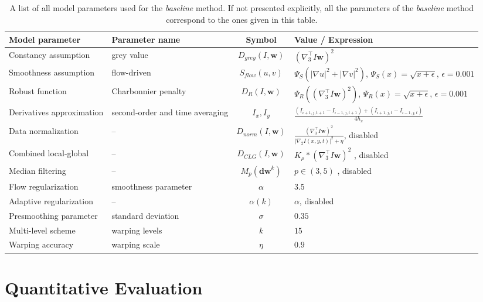 \begin{table}[ht] \footnotesize
\centering
\caption{A list of all model parameters used for the \textit{baseline} method. If not presented explicitly, all the parameters of the \textit{baseline} method  correspond to the ones given in this table.}
\begin{tabular}{lp{3cm}cp{5cm}}
\toprule
Model parameter & Parameter name & Symbol & Value / Expression   \\ 
\midrule
\midrule
Constancy assumption    & grey value & $D_{grey}(I,\textbf{w})$ & $(\nabla_{3}^{\top}I\textbf{w})^2$ \\ 
Smoothness assumption   & flow-driven & $S_{flow}(u,v)$ & $\Psi_{S}(|\nabla u|^2 + |\nabla v|^2)$, $\Psi_{S}(x) = \sqrt{x + \epsilon}$, $\epsilon = 0.001$ \\ 
Robust function  & Charbonnier penalty & $D_{R}(I,\textbf{w})$ & $ \Psi_R ( (\nabla_{3}^{\top}I\textbf{w})^2)$, $\Psi_{R}(x) = \sqrt{x + \epsilon}$, $\epsilon = 0.001$ \\
Derivatives approximation & second-order and time averaging & $I_x, I_y$ & $\frac{(I_{i+1,j,t+1} - I_{i-1,j,t+1}) + (I_{i+1,j,t} - I_{i-1,j,t})  }{4 h_x}$ \\
Data normalization & -- & $ D_{norm}(I,\textbf{w})$ &  $ \frac{(\nabla_{3}^{\top}I\textbf{w})^2}{|\nabla_2 I(x,y,t)|^2 + \eta} $, disabled \\
Combined local-global & -- & $ D_{CLG}(I,\textbf{w})$ &  $K_{\rho} \ast (\nabla_{3}^{\top}I\textbf{w})^2$ , disabled \\
Median filtering & -- & $  M_p (\textbf{dw}^{k})$ &  $ p \in (3,5)$ , disabled \\
Flow regularization & smoothness parameter & $\alpha$ &  $3.5$ \\
Adaptive regularization & -- & $\alpha(k)$ &  $\alpha$, disabled \\
Presmoothing parameter & standard deviation & $\sigma$ &  $0.35$ \\
Multi-level scheme & warping levels & $k$ &  $15$ \\
Warping accuracy & warping scale & $\eta$ &  $0.9$ \\
\bottomrule
\end{tabular}
\label{tab:baseline}%
\end{table}





 
\section{Quantitative Evaluation}
\label{experiments_synthetic_data}

